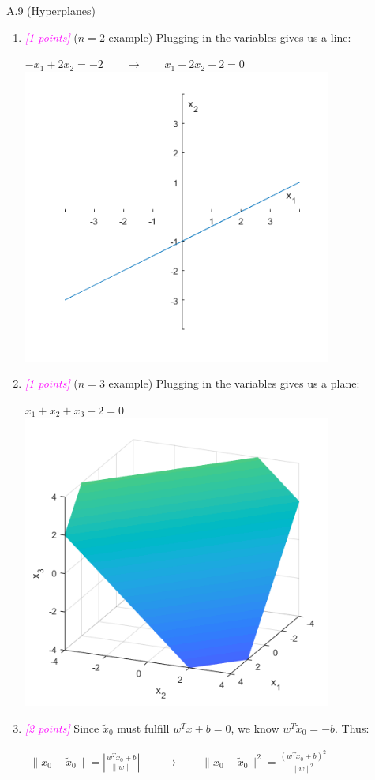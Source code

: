 \documentclass{article}
\newcommand{\1}{\mathbf{1}}
\newcommand{\points}[1]{\small\textcolor{magenta}{\emph{[#1 points]}} \normalsize}
\begin{document}
A.9 (Hyperplanes) 
\begin{enumerate}
	\item \points{1} ($n=2$ example) 
	Plugging in the variables gives us a line:
	\begin{center}
		$-x_1+2x_2=-2 \qquad \rightarrow \qquad x_1-2x_2-2=0$\\
		\includegraphics[width=4in]{A9a.png}
	\end{center}
	\item \points{1} ($n=3$ example) 
	Plugging in the variables gives us a plane:
	\begin{center}
		$x_1+x_2+x_3-2=0$\\
		\includegraphics[width=4in]{A9b.png}
	\end{center}
	\item \points{2} Since $\widetilde{x}_0$ must fulfill $w^Tx +b = 0$, we know $w^T\widetilde{x}_0=-b$. Thus:
	\begin{center}
		$\begin{aligned}\| x_0 - \widetilde{x}_0 \| = \left | \frac{w^Tx_0 +b}{\|w\|} \right | \qquad \rightarrow \qquad \| x_0 - \widetilde{x}_0 \|^2 =  \frac{(w^Tx_0 +b)^2}{\|w\|^2} \end{aligned} $
	\end{center}
	
\end{enumerate} 
\end{document}
